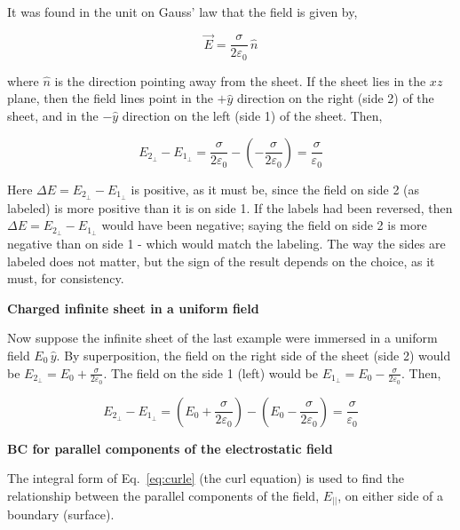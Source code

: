 \documentclass[12pt]{article}
\begin{document}
\begin{flushleft}
It was found in the unit on Gauss' law that the field is given by,

\begin{equation*}
\vec{E} = \frac{ \sigma }{2\varepsilon_{0}} \, \hat{n}
\end{equation*}

where $\hat{n}$ is the direction pointing away from the sheet.  If the sheet lies in the $xz$ plane, then the field lines point in the $+\hat{y}$ direction on the right (side 2) of the sheet, and in the $-\hat{y}$ direction on the left (side 1) of the sheet.  Then,

\begin{equation*}
E_{2_{\perp}} - E_{1_{\perp}} = \frac{\sigma}{2\varepsilon_{0}} - \left( -\frac{\sigma}{2\varepsilon_{0}} \right) = \frac{\sigma}{\varepsilon_{0}}
\end{equation*}

Here $\Delta E = E_{2_{\perp}} - E_{1_{\perp}}$ is positive, as it must be, since the field on side 2 (as labeled) is more positive than it is on side 1.  If the labels had been reversed, then $\Delta E = E_{2_{\perp}} - E_{1_{\perp}}$ would have been negative; saying the field on side 2 is more negative than on side 1 - which would match the labeling.  The way the sides are labeled does not matter, but the sign of the result depends on the choice, as it must, for consistency.

{\bf Charged infinite sheet in a uniform field}

Now suppose the infinite sheet of the last example were immersed in a uniform field $E_{0} \,\hat{y}$.  By superposition, the field on the right side of the sheet (side 2) would be $E_{2_{\perp}} = E_{0} + \frac{\sigma}{2\varepsilon_{0}}$.  The field on the side 1 (left) would be $E_{1_{\perp}} = E_{0} - \frac{\sigma}{2\varepsilon_{0}}$.  Then,

\begin{equation*}
E_{2_{\perp}} - E_{1_{\perp}} = \left( E_{0} + \frac{\sigma}{2\varepsilon_{0}} \right) - \left( E_{0} -\frac{\sigma}{2\varepsilon_{0}} \right) = \frac{\sigma}{\varepsilon_{0}}
\end{equation*}


\vspace{.2in}
{\bf \color{myblue} BC for parallel components of the electrostatic field}

The integral form of Eq.~\ref{eq:curle} (the curl equation) is used to find the relationship between the parallel components of the field, $E_{||}$, on either side of a boundary (surface).  


\end{flushleft}
\end{document}
